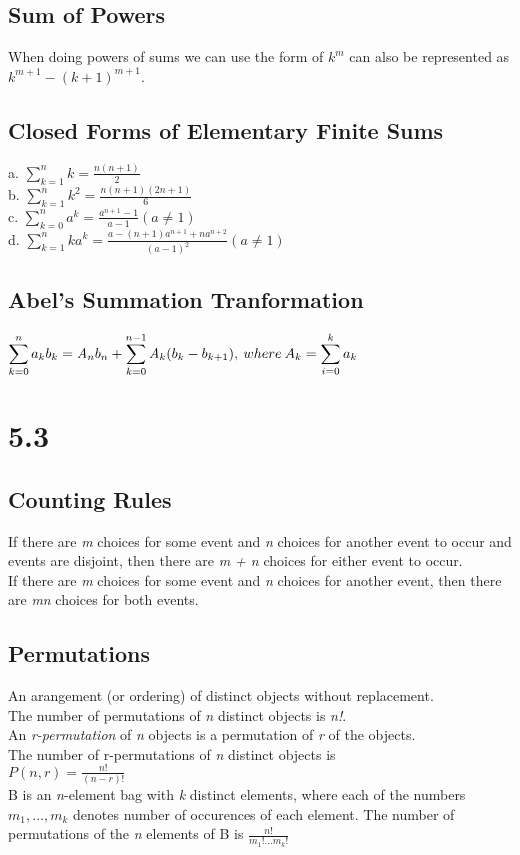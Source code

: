 \documentclass[10pt,twocolumn]{article}
\begin{document}
	\subsection*{Sum of Powers}
	When doing powers of sums we can use the form of $k^m$ can also be
	represented as $k^{m+1} - ( k + 1)^{m+1}$.

	\subsection*{Closed Forms of Elementary Finite Sums}
	a. $\displaystyle\sum_{k=1}^n k = \frac{n(n+1)}{2}$\\
	b. $\displaystyle\sum_{k=1}^n k^2 = \frac{n(n+1)(2n+1)}{6}$\\
	c. $\displaystyle\sum_{k=0}^n a^k = \frac{a^{n+1} - 1}{a -1} ( a \neq
	1)$\\
	d. $\displaystyle\sum_{k=1}^n ka^k = \frac{a - (n + 1)a^{n+1} +
	  na^{n+2}}{(a-1)^2} (a \neq 1)$\\

	\subsection*{Abel's Summation Tranformation}
	$\displaystyle\sum_{k=0}^n a_kb_k = \mathit{A}_nb_n + \sum_{k=0}^{n-1}
	\mathit{A}_k(b_k - b_{k+1}),\\
	  \:where\:A_k = \sum_{i=0}^k a_k$

	\section*{5.3}
	
	\subsection*{Counting Rules}
	If there are \textit{m} choices for some event and \textit{n} choices for another event to occur and events are disjoint, then there are \textit{m + n} choices for either event to occur. \\
	If there are \textit{m} choices for some event and \textit{n} choices for another event, then there are \textit{mn} choices for both events.
	\subsection*{Permutations}
	An arangement (or ordering) of distinct objects without replacement. \\
	The number of permutations of \textit{n} distinct objects is \textit{n!}. \\
	An \textit{r-permutation} of \textit{n} objects is a permutation of \textit{r} of the objects. \\
	The number of r-permutations of \textit{n} distinct objects is \\
	$P(n, r)=\frac{n!}{(n - r)!}$ \\
	B is an \textit{n}-element bag with \textit{k} distinct elements, where each of the numbers $m_1,\ldots,m_k$ denotes number of occurences of each element.  The number of permutations of the \textit{n} elements of B is $\frac{n!}{m_1! \ldots m_k!}$
\end{document}
